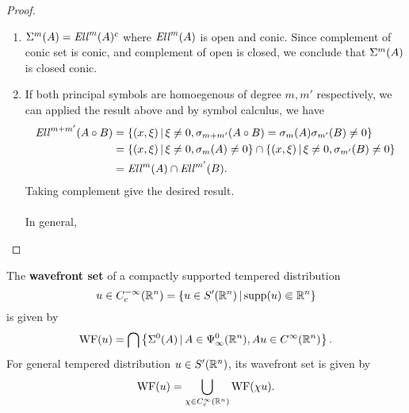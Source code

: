 \documentclass[12pt]{article}
\begin{document}
\begin{proof}
\begin{enumerate}
        \item $\Sigma^m(A) = \mathit{Ell}^m(A)^c$ where $\mathit{Ell}^m(A)$ is open and conic. Since complement of conic set is conic, and complement of open is closed, we conclude that $\Sigma^m(A)$ is closed conic. 
        
        
        \item If both principal symbols are homoegenous of degree $m, m'$ respectively, we can applied the result above and by symbol calculus, we have
        \begin{align*}
        \mathit{Ell}^{m + m'}(A \circ B) 
        & = \left\{(x, \xi) \, | \, \xi \neq 0, \sigma_{m + m'}(A \circ B) = \sigma_m(A) \sigma_{m'}(B) \neq 0\right\}\\
        & = \left\{(x, \xi) \, | \, \xi \neq 0, \sigma_m(A)  \neq 0\right\} \cap  \left\{(x, \xi) \, | \, \xi \neq 0, \sigma_{m'}(B)  \neq 0\right\} \\
        & = \mathit{Ell}^m(A) \cap \mathit{Ell}^{m'}(B). 
        \end{align*}
        Taking complement give the desired result. \\
        \\
        In general, 
    \end{enumerate}

\end{proof}



\begin{fdefinition}
    The \textbf{wavefront set} of a compactly supported tempered distribution 
    \[
    u \in C^{-\infty}_c({\mathbb R}^n) = \left\{u \in S'({\mathbb R}^n) \, | \, \mathrm{supp}(u) \Subset {\ensuremath {\mathbb R}}^n\right\} 
    \]
    is given by 
    \begin{align*}
    \mathrm{WF}(u) = \bigcap \left\{\Sigma^0(A) \, | \, A \in \Psi^0_\infty({\mathbb R}^n), Au \in C^\infty({\mathbb R}^n)\right\}. 
    \end{align*}
    For general tempered distribution $u \in S'({\mathbb R}^n)$, its wavefront set is given by 
    \begin{align*}
    \mathrm{WF}(u) = \bigcup_{\chi \in C^\infty_c({\mathbb R}^n)} \mathrm{WF}(\chi u). 
    \end{align*}
\end{fdefinition} 
\end{document}
